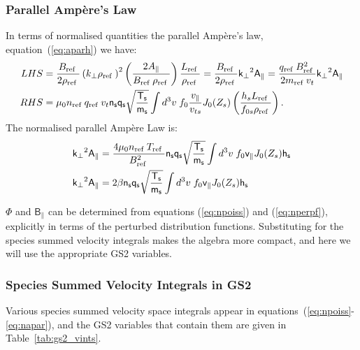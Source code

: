 \documentclass[10pt,a4paper]{article}
\newcommand{\n}[1]{{#1}_{\rm ref\;}}
\newcommand{\g}[1]{\mathsf{#1}}
\begin{document}
\subsubsection*{Parallel Amp\`ere's Law}
In terms of normalised quantities the parallel Amp\`ere's law,
equation~(\ref{eq:aparh}) we have:
\begin{align*}
  LHS & = \frac{\n{B}}{2 \n{\rho}} \left( k_{\perp} \n{\rho} \right)^2 \left(
    \frac{2A_{\parallel}}{\n{B} \n{\rho}} \right) \frac{\n{L}}{\n{\rho}} =
  \frac{\n{B}}{2\n{\rho}} \g{k_{\perp}}^2 \g{A_{\parallel}} = \frac{\n{q}
    \n{B}^2}{2 \n{m} v_t} \g{k_{\perp}}^2 \g{A_{\parallel}} \nonumber \\
  RHS & = \mu_0 \n{n} \n{q} v_{t} \g{n_s} \g{q_s}
  \sqrt{\frac{\g{T_s}}{\g{m_s}}} \int d^3v \; f_0 \frac{v_{\parallel}}{v_{ts}}
  J_0(Z_s) \left( \frac{h_s \n{L}}{f_{0s} \n{\rho}} \right).
\end{align*}
The normalised parallel Amp\`ere Law is:
\begin{align}
  \g{k_{\perp}}^2 \g{A_{\parallel}} & = \frac{4 \mu_0 \n{n} \n{T}}{\n{B}^2}
  \g{n_s} \g{q_s} \sqrt{\frac{\g{T_s}}{\g{m_s}}} \int d^3v \; f_0
  \g{v_{\parallel}} J_0(Z_s)
  \g{h_s} \nonumber \\
  \g{k_{\perp}}^2 \g{A_{\parallel}} & = 2 \g{\beta} \g{n_s} \g{q_s}
  \sqrt{\frac{\g{T_s}}{\g{m_s}}} \int d^3v \; f_0 \g{v_{\parallel}} J_0(Z_s)
  \g{h_s} \label{eq:napar}
\end{align}

$\g{\Phi}$ and $\g{B_{\parallel}}$ can be determined from equations
(\ref{eq:npoiss}) and (\ref{eq:nperpf}), explicitly in terms of the perturbed
distribution functions. Substituting for the species summed velocity integrals
makes the algebra more compact, and here we will use the appropriate GS2
variables.

\subsubsection{Species Summed Velocity Integrals in GS2}
Various species summed velocity space integrals appear in
equations~(\ref{eq:npoiss}-\ref{eq:napar}), and the GS2 variables that contain
them are given in Table~\ref{tab:gs2_vints}.
\end{document}
